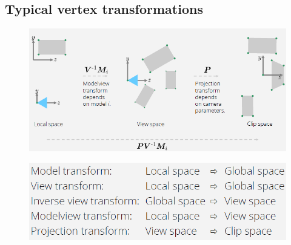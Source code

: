 \documentclass{article}
\begin{document}
\subsection{Typical vertex transformations}
\begin{figure}[h!]
\includegraphics[scale=0.6]{image45.png}\\
\end{figure}
\begin{figure}[h!]
\includegraphics[scale=0.6]{image47.png}\\
\end{figure}
\end{document}
